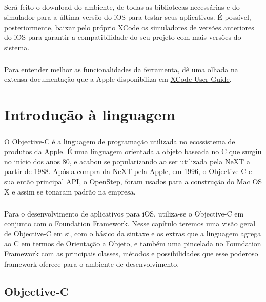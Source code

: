 \documentclass[a4paper,12pt,brazil,doubleside]{book}
\begin{document}
\paragraph{}Será feito o download do ambiente, de todas as bibliotecas necessárias e do simulador para a última versão do iOS para testar seus aplicativos. É possível, posteriormente, baixar pelo próprio XCode os simuladores de versões anteriores do iOS para garantir a compatibilidade do seu projeto com mais versões do sistema.
\paragraph{}Para entender melhor as funcionalidades da ferramenta, dê uma olhada na extensa documentação que a Apple disponibiliza em 
\href{https://developer.apple.com/library/ios/#documentation/ToolsLanguages/Conceptual/Xcode_User_Guide}{XCode User Guide}.


\chapter{Introdução à linguagem}

\paragraph{}O Objective-C é a linguagem de programação utilizada no ecossistema de produtos da Apple. É uma linguagem orientada a objeto baseada no C que surgiu no início dos anos 80, e acabou se popularizando ao ser utilizada pela NeXT a partir de 1988. Após a compra da NeXT pela Apple, em 1996, o Objective-C e sua então principal API, o OpenStep, foram usados para a construção do Mac OS X e assim se tonaram padrão na empresa.
\paragraph{}Para o desenvolvimento de aplicativos para iOS, utiliza-se o Objective-C em conjunto com o Foundation Framework. Nesse capítulo teremos uma visão geral de Objective-C em si, com o básico da sintaxe e os extras que a linguagem agrega ao C em termos de Orientação a Objeto, e também uma pincelada no Foundation Framework com as principais classes, métodos e possibilidades que esse poderoso framework oferece para o ambiente de desenvolvimento.

\bigskip 
\bigskip


\section{Objective-C}
\end{document}
